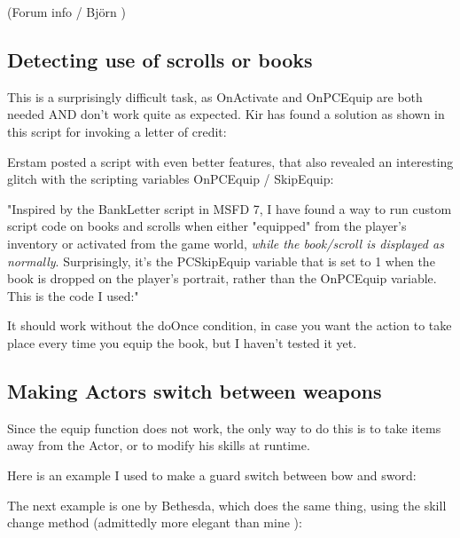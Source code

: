 \documentclass[
]{article}
\begin{document}
(Forum info / Björn )

\hypertarget{detecting-use-of-scrolls-or-books}{%
\subsection{\texorpdfstring{\hfill\break
Detecting use of scrolls or
books}{ Detecting use of scrolls or books}}\label{detecting-use-of-scrolls-or-books}}

This is a surprisingly difficult task, as OnActivate and OnPCEquip are
both needed AND don't work quite as expected. Kir has found a solution
as shown in this script for invoking a letter of credit:



Erstam posted a script with even better features, that also revealed an
interesting glitch with the scripting variables OnPCEquip / SkipEquip:

"Inspired by the BankLetter script in MSFD 7, I have found a way to run
custom script code on books and scrolls when either "equipped" from the
player's inventory or activated from the game world, \emph{while the
book/scroll is displayed as normally}. Surprisingly, it's the
PCSkipEquip variable that is set to 1 when the book is dropped on the
player's portrait, rather than the OnPCEquip variable. This is the code
I used:"



It should work without the doOnce condition, in case you want the action
to take place every time you equip the book, but I haven't tested it
yet.

\hypertarget{making-actors-switch-between-weapons}{%
\subsection{\texorpdfstring{\hfill\break
Making Actors switch between
weapons}{ Making Actors switch between weapons}}\label{making-actors-switch-between-weapons}}

Since the equip function does not work, the only way to do this is to
take items away from the Actor, or to modify his skills at runtime.

Here is an example I used to make a guard switch between bow and sword:



The next example is one by Bethesda, which does the same thing, using
the skill change method (admittedly more elegant than mine ):
\end{document}
